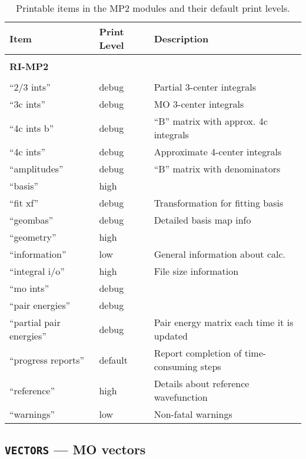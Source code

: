 \begin{table}
\caption{Printable items in the MP2 modules and their default print levels.}
\label{tbl:mp2-printable}
\begin{tabular}{lll}
\hline\hline
Item                    & Print Level   & Description \\
\hline

        & & \\ 
{\bf RI-MP2}  & & \\ \hline
        & & \\ 
``2/3 ints''              & debug         & Partial 3-center integrals \\
``3c ints''               & debug         & MO 3-center integrals  \\
``4c ints b''             & debug         & ``B'' matrix with approx. 4c integrals \\
``4c ints''               & debug         & Approximate 4-center integrals \\
``amplitudes''            & debug         & ``B'' matrix with denominators \\
``basis''                 & high          & \\
``fit xf''                & debug         & Transformation for fitting basis \\
``geombas''               & debug         & Detailed basis map info\\
``geometry''              & high          & \\
``information''           & low           & General information about calc.\\
``integral i/o''          & high          & File size information\\
``mo ints''               & debug         & \\
``pair energies''         & debug         & \\
``partial pair energies'' & debug         & Pair energy matrix each time it is updated \\
``progress reports''      & default       & Report completion of time-consuming steps\\
``reference''             & high          & Details about reference wavefunction\\
``warnings''              & low           & Non-fatal warnings \\
\hline\hline
\end{tabular}
\end{table}

\subsection{{\tt VECTORS} --- MO vectors}
\label{sec:mp2vectors}

